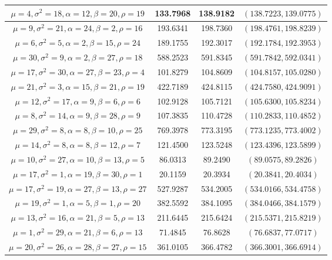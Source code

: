 \documentclass[12pt,travaildirige,nobabel, twoside]{dms}
\numberwithin{equation}{section}
\numberwithin{table}{chapter}
\numberwithin{figure}{chapter}
\begin{document}
\begin {table}[h]
\begin{adjustbox}{width=1.1\textwidth}
\begin{tabular}{|c|c|c|c|}
   	\hline
$\mu= 4,\sigma^2=18,\alpha=12,\beta=20,\rho=19$   & 133.7968  & 138.9182  &   $(138.7223,139.0775) $  \\   
   	\hline
$\mu= 9,\sigma^2=21,\alpha=24,\beta= 2,\rho=16$   & 193.6341  & 198.7360  &   $(198.4761,198.8239) $  \\   
   	\hline
$\mu= 6,\sigma^2= 5,\alpha= 2,\beta=15,\rho=24$   & 189.1755  & 192.3017  &   $(192.1784,192.3953) $  \\   
   	\hline
$\mu=30,\sigma^2= 9,\alpha= 2,\beta=27,\rho=18$   & 588.2523  & 591.8345  &   $(591.7842,592.0341) $  \\   
   	\hline
$\mu=17,\sigma^2=30,\alpha=27,\beta=23,\rho= 4$   & 101.8279  & 104.8609  &   $(104.8157,105.0280) $  \\   
   	\hline
$\mu=21,\sigma^2= 3,\alpha=15,\beta=21,\rho=19$   & 422.7189  & 424.8115  &   $(424.7580,424.9091) $  \\   
   	\hline
$\mu=12,\sigma^2=17,\alpha= 9,\beta= 6,\rho= 6$   & 102.9128  & 105.7121  &   $(105.6300,105.8234) $  \\   
   	\hline
$\mu= 8,\sigma^2=14,\alpha= 9,\beta=28,\rho= 9$   & 107.3835  & 110.4728  &   $(110.2833,110.4852) $ \\   
   	\hline
$\mu=29,\sigma^2= 8,\alpha= 8,\beta=10,\rho=25$   & 769.3978  & 773.3195  &   $(773.1235,773.4002) $  \\   
   	\hline
$\mu=14,\sigma^2= 8,\alpha= 8,\beta=12,\rho= 7$   & 121.4500  & 123.5248  &   $(123.4396,123.5899) $  \\   
   	\hline
$\mu=10,\sigma^2=27,\alpha=10,\beta=13,\rho= 5$   & 86.0313  & 89.2490  &   $(89.0575,89.2826) $  \\   
   	\hline
$\mu=17,\sigma^2= 1,\alpha=19,\beta=30,\rho= 1$   & 20.1159  & 20.3934  &   $(20.3841,20.4034) $  \\   
   	\hline
$\mu=17,\sigma^2=19,\alpha=27,\beta=13,\rho=27$   & 527.9287  & 534.2005  &   $(534.0166,534.4758) $  \\   
   	\hline
$\mu=19,\sigma^2= 1,\alpha= 5,\beta= 1,\rho=20$   & 382.5592  & 384.1095  &   $(384.0466,384.1579) $  \\   
   	\hline
$\mu=13,\sigma^2=16,\alpha=21,\beta= 5,\rho=13$   & 211.6445  & 215.6424  &   $(215.5371,215.8219) $  \\   
   	\hline
$\mu= 1,\sigma^2=29,\alpha=21,\beta= 6,\rho=13$   & 71.4845  & 76.8628  &   $(76.6837,77.0717) $  \\   
   	\hline
$\mu=20,\sigma^2=26,\alpha=28,\beta=27,\rho=15$   & 361.0105  & 366.4782  &   $(366.3001,366.6914) $  \\   

\end{tabular}
\end{adjustbox}
\end{table}
\end{document}
